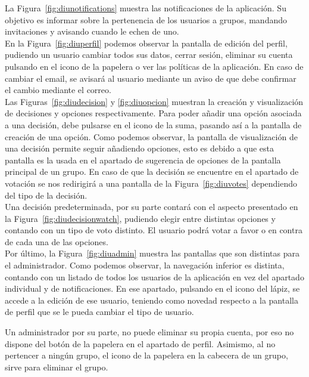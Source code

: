     La Figura~\ref{fig:diunotifications} muestra las notificaciones de la aplicación. Su objetivo es informar sobre la pertenencia de los usuarios a grupos, mandando invitaciones y avisando cuando le echen de uno. \\

    En la Figura~\ref{fig:diuperfil} podemos observar la pantalla de edición del perfil, pudiendo un usuario cambiar todos sus datos, cerrar sesión, eliminar su cuenta pulsando en el icono de la papelera o ver las políticas de la aplicación. En caso de cambiar el email, se avisará al usuario mediante un aviso de que debe confirmar el cambio mediante el correo. \\

    Las Figuras~\ref{fig:diudecision} y \ref{fig:diuopcion} muestran la creación y visualización de decisiones y opciones respectivamente. Para poder añadir una opción asociada a una decisión, debe pulsarse en el icono de la suma, pasando así a la pantalla de creación de una opción. Como podemos observar, la pantalla de visualización de una decisión permite seguir añadiendo opciones, esto es debido a que esta pantalla es la usada en el apartado de sugerencia de opciones de la pantalla principal de un grupo. En caso de que la decisión se encuentre en el apartado de votación se nos redirigirá a una pantalla de la Figura~\ref{fig:diuvotes} dependiendo del tipo de la decisión. \\

    Una decisión predeterminada, por su parte contará con el aspecto presentado en la Figura~\ref{fig:diudecisionwatch}, pudiendo elegir entre distintas opciones y contando con un tipo de voto distinto. El usuario podrá votar a favor o en contra de cada una de las opciones. \\

    Por último, la Figura~\ref{fig:diuadmin} muestra las pantallas que son distintas para el administrador. Como podemos observar, la navegación inferior es distinta, contando con un listado de todos los usuarios de la aplicación en vez del apartado individual y de notificaciones. En ese apartado, pulsando en el icono del lápiz, se accede a la edición de ese usuario, teniendo como novedad respecto a la pantalla de perfil que se le pueda cambiar el tipo de usuario.
    
    Un administrador por su parte, no puede eliminar su propia cuenta, por eso no dispone del botón de la papelera en el apartado de perfil. Asimismo, al no pertencer a ningún grupo, el icono de la papelera en la cabecera de un grupo, sirve para eliminar el grupo. 

